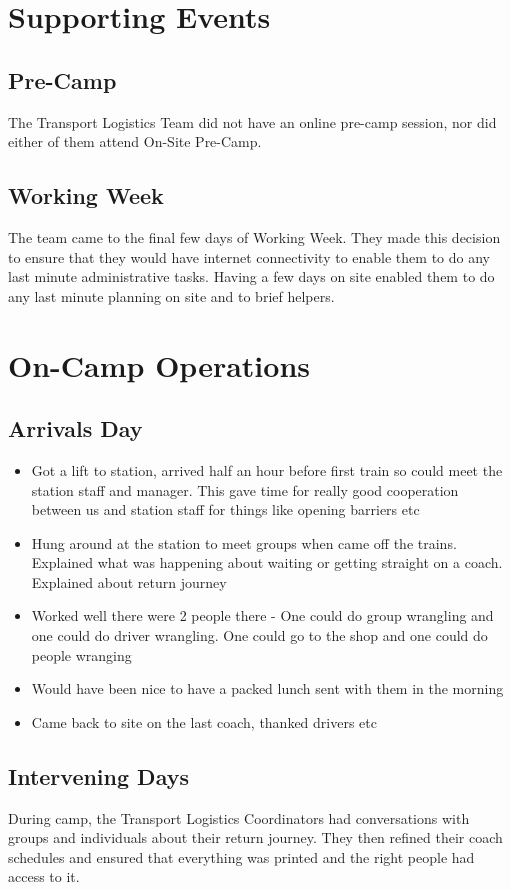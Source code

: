 \section{Supporting Events}
\subsection{Pre-Camp}
The Transport Logistics Team did not have an online pre-camp session, nor did either of them attend On-Site Pre-Camp.
\subsection{Working Week}
The team came to the final few days of Working Week. They made this decision to ensure that they would have internet connectivity to enable them to do any last minute administrative tasks. Having a few days on site enabled them to do any last minute planning on site and to brief helpers.

\section{On-Camp Operations}
\subsection{Arrivals Day}
\begin{itemize}
    \item Got a lift to station, arrived half an hour before first train so could meet the station staff and manager. This gave time for really good cooperation between us and station staff for things like opening barriers etc
    \item Hung around at the station to meet groups when came off the trains. Explained what was happening about waiting or getting straight on a coach. Explained about return journey 
    \item Worked well there were 2 people there - One could do group wrangling and one could do driver wrangling. One could go to the shop and one could do people wranging
    \item Would have been nice to have a packed lunch sent with them in the morning
    \item Came back to site on the last coach, thanked drivers etc
\end{itemize}

\subsection{Intervening Days}
During camp, the Transport Logistics Coordinators had conversations with groups and individuals about their return journey. They then refined their coach schedules and ensured that everything was printed and the right people had access to it.\\

